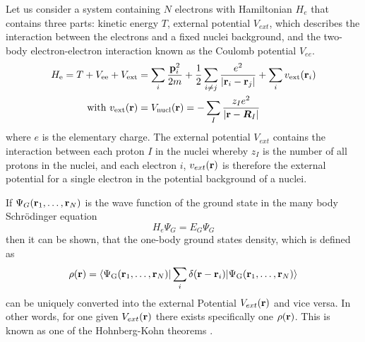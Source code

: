 	Let us consider a system containing $N$ electrons 
	with Hamiltonian $H_e$ 
	that contains three parts: kinetic energy $T$, external potential $V_{ext}$, which describes the interaction between the electrons and a fixed nuclei background, and the two-body electron-electron interaction known as the Coulomb potential $V_{ee}$.
	\begin{align}
		H_\text{e} = T + V_{\text{ee}} + V_{\text{ext}} &= \sum_i \frac{\textbf{p}^2_i}{2m} +
		\frac{1}{2} \sum_{i\neq j} \frac{e^2}{|\textbf{r}_i - \textbf{r}_j|} + \sum_i v_{\text{ext}}(\textbf{r}_i) \\
		\text{with} ~v_{\text{ext}}(\textbf{r}) &= V_{\text{nucl}}(\textbf{r})= -\sum_I \frac{z_I e^2}{|\textbf{r} - \boldsymbol{R}_I|}
	\end{align}	
	where $e$ is the elementary charge.
	The external potential $V_{ext}$ contains the interaction between each proton $I$ in the nuclei whereby $z_I$ is the number of all protons in the nuclei, and each electron $i$, $v_{ext}(\textbf{r})$ is therefore the external potential for a single electron in the potential background of a nuclei. 

	If $\Psi_G(\textbf{r}_1,\dots,\textbf{r}_N)$ is the wave function of the ground state in the many body Schrödinger equation
	\begin{equation}
		H_e \Psi_G = E_G \Psi_G
	\end{equation}
	then it can be shown, that the one-body ground states density, which is defined as
	\begin{equation}
		 \rho(\textbf{r}) = \braket{\Psi_\text{G}(\textbf{r}_1,\dots,\textbf{r}_N)|\sum_i \delta (\textbf{r} -\textbf{r}_i)| \Psi_\text{G}(\textbf{r}_1,\dots,\textbf{r}_N)}
	\end{equation}
	can be uniquely converted into the external Potential $V_{ext}(\textbf{r})$ and vice versa. In other words, for one given $V_{ext}(\textbf{r})$ there exists specifically one $\rho(\textbf{r})$. This is known as one of the Hohnberg-Kohn theorems \cite{solid_state_book}. 
	
